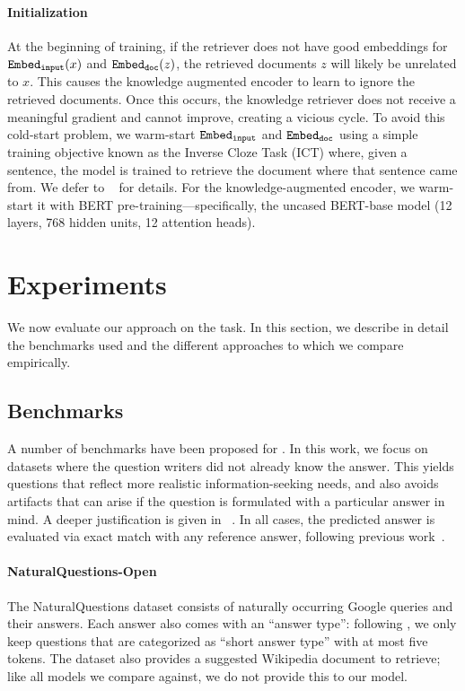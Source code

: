 \documentclass{article}
\begin{document}
\paragraph{Initialization}
At the beginning of training, if the retriever does not have good embeddings for $\mathtt{Embed_{input}}(x)$ and $\mathtt{Embed_{doc}}(z)$, the retrieved documents $z$ will likely be unrelated to $x$. This causes the knowledge augmented encoder to learn to ignore the retrieved documents. Once this occurs, the knowledge retriever does not receive a meaningful gradient and cannot improve, creating a vicious cycle. To avoid this cold-start problem, we warm-start $\mathtt{Embed_{input}}$ and $\mathtt{Embed_{doc}}$ using a simple training objective known as the Inverse Cloze Task (ICT) where, given a sentence, the model is trained to retrieve the document where that sentence came from. We defer to ~\citet{orqa} for details. For the knowledge-augmented encoder, we warm-start it with BERT pre-training---specifically, the uncased BERT-base model (12 layers, 768 hidden units, 12 attention heads).
 \section{Experiments} \label{sec:experiments}


We now evaluate our approach on the \openqa task.
In this section, we describe in detail the benchmarks used and the different approaches to which we compare empirically.

\subsection{\openqa Benchmarks}
A number of benchmarks have been proposed for \openqa. In this work, we focus on datasets where the question writers did not already know the answer. This yields questions that reflect more realistic information-seeking needs, and also avoids artifacts that can arise if the question is formulated with a particular answer in mind. A deeper justification is given in ~\citet{orqa}.
In all cases, the predicted answer is evaluated via exact match with any reference answer, following previous \openqa work~\cite{drqa}.

\paragraph{NaturalQuestions-Open} The NaturalQuestions dataset \cite{naturalquestions} consists of naturally occurring Google queries and their answers. Each answer also comes with an ``answer type'': following \citet{orqa}, we only keep questions that are categorized as ``short answer type'' with at most five tokens. The dataset also provides a suggested Wikipedia document to retrieve; like all models we compare against, we do not provide this to our model.
\end{document}
